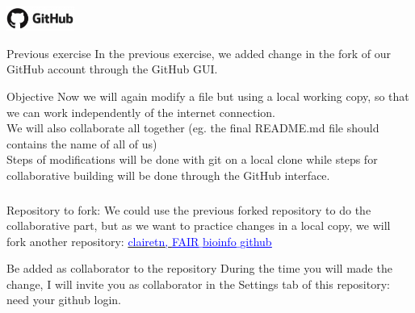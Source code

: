 \begin{frame}{\includegraphics[height=0.8cm]{shared/logo-github.png}}
\begin{exampleblock}{Previous exercise}
In the previous exercise, we added change in the fork of our GitHub account through the GitHub GUI.
\end{exampleblock}
\begin{exampleblock}{Objective}
Now we will again modify a file but using a local working copy, so that we can work independently of the internet connection.\\
We will also collaborate all together (eg. the final README.md file should contains the name of all of us) \\
\vfill
Steps of modifications will be done with git on a local clone while steps for collaborative building will be done through the GitHub interface.
\end{exampleblock}
\end{frame}
\begin{frame}[containsverbatim]
\frametitle{}
\begin{exampleblock}{Repository to fork:}
We could use the previous forked repository to do the collaborative part, but as we want to practice changes in a local copy, we will fork another repository: \href{https://github.com/clairetn/FAIR_bioinfo_github.git}{\textcolor{blue}{clairetn, \underline{FAIR$\_$bioinfo$\_$github}}}
\end{exampleblock}
\begin{exampleblock}{Be added as collaborator to the repository}
During the time you will made the change, I will invite you as collaborator in the Settings tab of this repository: need your github login.
\end{exampleblock}
\end{frame}
